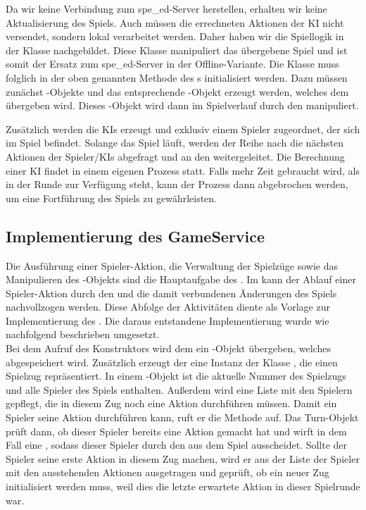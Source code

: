 Da wir keine Verbindung zum spe\_ed-Server herstellen, erhalten wir keine Aktualisierung des Spiels.
Auch müssen die errechneten Aktionen der \ac{KI} nicht versendet, sondern lokal verarbeitet werden.
Daher haben wir die Spiellogik in der Klasse  nachgebildet.
Diese Klasse manipuliert das übergebene Spiel und ist somit der Ersatz zum spe\_ed-Server in der Offline-Variante.
Die Klasse  muss folglich in der oben genannten Methode  des s
initialisiert werden.
Dazu müssen zunächst -Objekte und das entsprechende -Objekt erzeugt werden, welches dem
 übergeben wird.
Dieses -Objekt wird dann im Spielverlauf durch den  manipuliert.

Zusätzlich werden die \ac{KI}s erzeugt und exklusiv einem Spieler zugeordnet, der sich im Spiel befindet.
Solange das Spiel läuft, werden der Reihe nach die nächsten Aktionen der
Spieler/\ac{KI}s abgefragt und an den  weitergeleitet.
Die Berechnung einer \ac{KI} findet in einem eigenen Prozess statt.
Falls mehr Zeit gebraucht wird, als in der Runde zur Verfügung steht, kann der Prozess dann abgebrochen werden, um eine
Fortführung des Spiels zu gewährleisten.

\subsection{Implementierung des GameService}
\label{subsec:game-service}

Die Ausführung einer Spieler-Aktion, die Verwaltung der Spielzüge sowie das Manipulieren des -Objekts sind
die Hauptaufgabe des .
Im  kann der Ablauf einer Spieler-Aktion durch den
 und die damit verbundenen Änderungen des Spiels nachvollzogen werden.
Diese Abfolge der Aktivitäten diente als Vorlage zur Implementierung des .
Die daraus entstandene Implementierung wurde wie nachfolgend beschrieben umgesetzt. \\

Bei dem Aufruf des Konstruktors wird dem  ein -Objekt übergeben, welches abgespeichert
wird.
Zusätzlich erzeugt der  eine Instanz der Klasse , die einen Spielzug repräsentiert.
In einem -Objekt ist die aktuelle Nummer des Spielzugs und alle Spieler des Spiels enthalten.
Außerdem wird eine Liste mit den Spielern gepflegt, die in diesem Zug noch eine Aktion durchführen müssen.
Damit ein Spieler seine Aktion durchführen kann, ruft er die Methode  auf.
Das Turn-Objekt prüft dann, ob dieser Spieler bereits eine Aktion gemacht hat und wirft in dem Fall eine
, sodass dieser Spieler durch den  aus dem Spiel ausscheidet.
Sollte der Spieler seine erste Aktion in diesem Zug machen, wird er aus der Liste der Spieler mit den ausstehenden
Aktionen ausgetragen und geprüft, ob ein neuer Zug initialisiert werden muss, weil dies die letzte erwartete Aktion
in dieser Spielrunde war. \\

